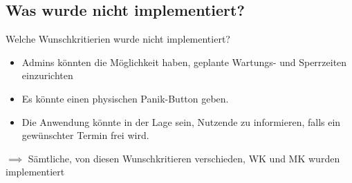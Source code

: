 \documentclass{sdqbeamer}
\begin{document}
\subsection{Was wurde nicht implementiert?}
\begin{frame}{Welche Wunschkritierien wurde nicht implementiert?}
    \begin{itemize}
        \item Admins könnten die Möglichkeit haben, geplante Wartungs- und Sperrzeiten einzurichten
        \item Es könnte einen physischen Panik-Button geben.
        \item  Die Anwendung könnte in der Lage sein, Nutzende zu informieren, falls ein gewünschter Termin frei wird.
    \end{itemize}
    \hfill \break
    \hfill \break
    $\implies$ Sämtliche, von diesen Wunschkritieren verschieden, WK und MK wurden implementiert
\end{frame}
\end{document}
